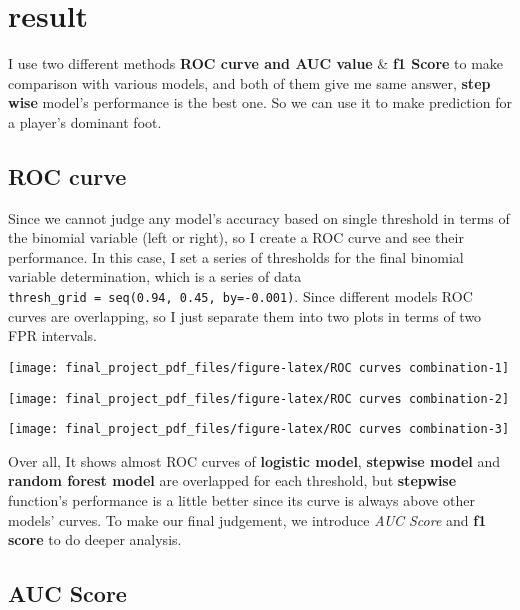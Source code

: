 \documentclass[
]{article}
\begin{document}
\hypertarget{result}{%
\section{result}\label{result}}

I use two different methods \textbf{ROC curve and AUC value} \&
\textbf{f1 Score} to make comparison with various models, and both of
them give me same answer, \textbf{step wise} model's performance is the
best one. So we can use it to make prediction for a player's dominant
foot.

\hypertarget{roc-curve}{%
\subsection{ROC curve}\label{roc-curve}}

Since we cannot judge any model's accuracy based on single threshold in
terms of the binomial variable (left or right), so I create a ROC curve
and see their performance. In this case, I set a series of thresholds
for the final binomial variable determination, which is a series of data
\texttt{thresh\_grid\ =\ seq(0.94,\ 0.45,\ by=-0.001)}. Since different
models ROC curves are overlapping, so I just separate them into two
plots in terms of two FPR intervals.

\begin{center}\texttt{[image: final\_project\_pdf\_files/figure-latex/ROC curves combination-1]} \end{center}

\begin{center}\texttt{[image: final\_project\_pdf\_files/figure-latex/ROC curves combination-2]} \end{center}

\begin{center}\texttt{[image: final\_project\_pdf\_files/figure-latex/ROC curves combination-3]} \end{center}

Over all, It shows almost ROC curves of \textbf{logistic model},
\textbf{stepwise model} and \textbf{random forest model} are overlapped
for each threshold, but \textbf{stepwise} function's performance is a
little better since its curve is always above other models' curves. To
make our final judgement, we introduce \emph{AUC Score} and \textbf{f1
score} to do deeper analysis.

\hypertarget{auc-score}{%
\subsection{AUC Score}\label{auc-score}}
\end{document}
